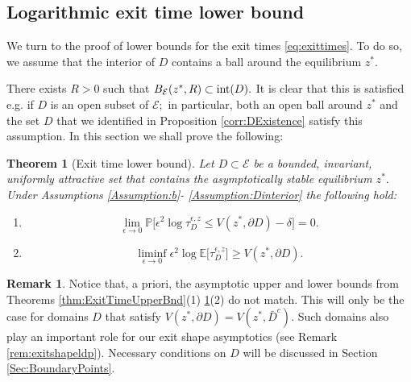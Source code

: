 \documentclass[10pt, reqno]{amsart}
\newcommand{\pr}{\mathbb{P}}
\newcommand{\ex}{\mathbb{E}}
\newcommand{\e}{\mathcal{E}}
\newtheorem{thm}{Theorem}
\newenvironment{customthm}[1]
{\renewcommand\theinnercustomthm{#1}\innercustomthm}
{\endinnercustomthm}
\theoremstyle{definition}
\newtheorem{rem}{Remark}
\numberwithin{lem}{section}
\numberwithin{cor}{section}
\numberwithin{prop}{section}
\numberwithin{thm}{section}
\numberwithin{dfn}{section}
\begin{document}
\subsection{Logarithmic exit time lower bound}\label{Sec:ExitTimesLB}We turn to the proof of lower bounds for the exit times \eqref{eq:exittimes}. To do so, we assume that the interior of $D$ contains a ball around the equilibrium $z^*.$ 

\begin{customthm}{5}\label{Assumption:Dinterior}  There exists $R>0$ such that 
 $B_\e(z^*, R)\subset \textnormal{int}(D).$
     \end{customthm}
It is clear that this is satisfied e.g. if $D$ is an open subset of $\e;$ in particular, both an open ball around $z^*$ and the set $D$ that we identified in Proposition \ref{corr:DExistence} satisfy this assumption. In this section we shall prove the following:


\begin{thm}[Exit time lower bound]\label{thm:ExitTimeLowerBnd} Let $D\subset\e$ be a bounded, invariant, uniformly attractive set that contains the asymptotically stable equilibrium $z^*.$ Under Assumptions \ref{Assumption:b}- \ref{Assumption:Dinterior} the following hold:
\begin{enumerate} 
\item  $$\lim_{\epsilon\to 0}\pr\bigg[ \epsilon^2\log\tau_D^{\epsilon,z}\leq V(z^*, \partial D)-\delta \bigg]=0.$$
    \item $$\liminf_{\epsilon\to 0}\epsilon^2\log\ex\big[ \tau_D^{\epsilon,z}\big]\geq V(z^*, \partial D).$$ 
\end{enumerate}
\end{thm}



\begin{rem}\label{rem:exittimematching} Notice that, a priori, the asymptotic upper and lower bounds from Theorems \ref{thm:ExitTimeUpperBnd}(1) \ref{thm:ExitTimeLowerBnd}(2) do not match. This will only be the case for domains $D$ that satisfy $V(z^*, \partial D)=V(z^*, \bar{D}^c).$ Such domains also play an important role for our exit shape asymptotics (see Remark \ref{rem:exitshapeldp}). Necessary conditions on $D$ will be discussed in Section \ref{Sec:BoundaryPoints}.    
\end{rem}
\end{document}
